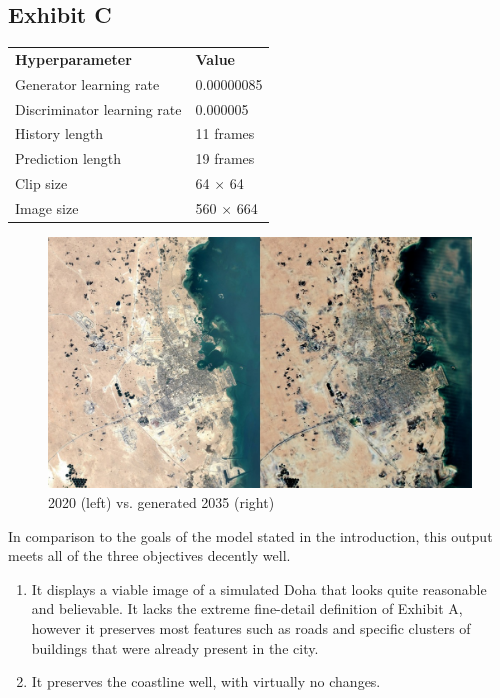 \documentclass{article}
\begin{document}
\clearpage

\subsection{Exhibit C}

\begin{table}[h]
\begin{tabular}{ll}
\textbf{Hyperparameter} & \textbf{Value}\\
Generator learning rate & 0.00000085\\
Discriminator learning rate & 0.000005\\
History length & 11 frames\\
Prediction length & 19 frames\\
Clip size & 64 $\times$ 64\\
Image size & 560 $\times$ 664\\
\end{tabular}
\end{table}

\begin{figure}[H]
    \caption{2020 (left) vs. generated 2035 (right)}
    \centering
    \includegraphics[width=0.7\linewidth]{exhibit-c-comp.jpg}
\end{figure}

In comparison to the goals of the model stated in the introduction, this output meets all of the three objectives decently well.

\begin{enumerate}[label=(\alph*)]
    \item It displays a viable image of a simulated Doha that looks quite reasonable and believable. It lacks the extreme fine-detail definition of Exhibit A, however it preserves most features such as roads and specific clusters of buildings that were already present in the city.
    \item It preserves the coastline well, with virtually no changes.
\end{enumerate}
\end{document}

